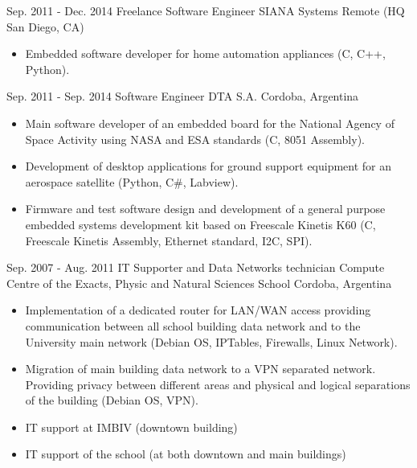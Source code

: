   \cventry
    {Sep. 2011 - Dec. 2014} %
    {Freelance Software Engineer} %
    {SIANA Systems} %
    {Remote (HQ San Diego, CA)} %
    {}
    {
      \begin{itemize} %
        \item {Embedded software developer for home automation appliances (C, C++, Python).}
      \end{itemize}
    }

  \cventry
    {Sep. 2011 - Sep. 2014} %
    {Software Engineer} %
    {DTA S.A.} %
    {Cordoba, Argentina} %
    {}
    {
      \begin{itemize} %
        \item {Main software developer of an embedded board for the National Agency of Space Activity using NASA and ESA standards (C, 8051 Assembly).}
        \item {Development of desktop applications for ground support equipment for an aerospace satellite (Python, C\#, Labview).}
        \item {Firmware and test software design and development of a general purpose embedded systems development kit based on Freescale Kinetis K60 (C, Freescale Kinetis Assembly, Ethernet standard, I2C, SPI).}
      \end{itemize}
    }

  \cventry
    {Sep. 2007 - Aug. 2011} %
    {IT Supporter and Data Networks technician} %
    {Compute Centre of the Exacts, Physic and Natural Sciences School} %
    {Cordoba, Argentina} %
    {}
    {
      \begin{itemize} %
        \item {Implementation of a dedicated router for LAN/WAN access providing communication between all school building data network and to the University main network (Debian OS, IPTables, Firewalls, Linux Network).}
        \item {Migration of main building data network to a VPN separated network. Providing privacy between different areas and physical and logical separations of the building (Debian OS, VPN)}.
        \item {IT support at IMBIV (downtown building)}
        \item {IT support of the school (at both downtown and main buildings)}
      \end{itemize}
    }


